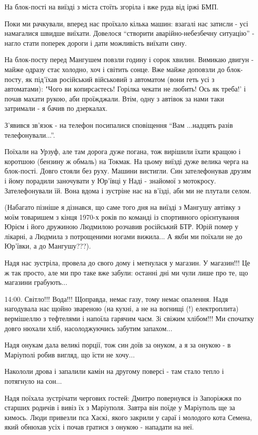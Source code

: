 На блок-пості на виїзді з міста стоїть згоріла і вже руда від іржі БМП. 

Поки ми рачкували, вперед нас проїхало кілька машин: взагалі нас затисли - усі
намагалися швидше виїхати. Довелося \enquote{створити аварійно-небезбечну ситуацію} -
нагло стати поперек дороги і дати можливість виїхати сину.

На блок-посту перед Мангушем повзли годину і сорок хвилин. Вимикаю двигун -
майже одразу стає холодно, хоч і світить сонце. Вже майже доповзли до
блок-посту, як під'їхав російський військовий з автоматом (вони геть усі з
автоматами): "Чого ви копирсаєтесь! Горілка чекати не любить! Ось як треба!' і
почав махати рукою, аби проїжджали. Втім, одну з автівок за нами таки затримали
- я бачив по дзеркалах.

З'явився зв'язок - на телефон посипалися сповіщення \enquote{Вам ...надцять разів
телефонували...}.

Поїхали на Урзуф, але там дорога дуже погана, тож вирішили їхати кращою і
коротшою (бензину ж обмаль) на Токмак. На цьому виїзді дуже велика черга на
блок-пості. Довго стояли  без руху. Машини вистигли. Син зателефонував друзям і
йому порадили заночувати у Юр'ївці у Наді - знайомої з мотокросу.
Зателефонували їй. Вона вдома і зустріне нас на в'їзді, аби ми не плутали
селом.

(Набагато пізніше я дізнався, що саме того дня на виїзді з Мангушу автівку з
моїм товаришем з кінця 1970-х років по команді із спортивного орієнтування
Юрієм і його дружиною Людмилою розчавив російський БТР. Юрій помер у лікарні, а
Людмила з потрощеними ногами вижила... А якби ми поїхали не до Юр'ївки, а до
Мангушу???).

Надя нас зустріла, провела до свого дому і метнулася у магазин. У магазин!!! Це
ж так просто, але ми про таке вже забули: останні дні ми чули лише про те, що
магазини грабують...

14:00. Світло!!! Вода!!! Щоправда, немає газу, тому немає опалення. Надя
нагодувала нас щойно звареною (на кухні, а не на вогнищі (!) електроплита)
вермішеллю з тефтелями і напоїла гарячим чаєм. Зі свіжим хлібом!!! Ми спочатку
довго нюхали хліб, насолоджуючись забутим запахом...

Надя онукам дала великі порції, тож син доїв за онуком, а я за онукою - в
Маріуполі робив вигляд, що їсти не хочу...

Накололи дрова і запалили камін на другому поверсі - там стало тепло і
потягнуло на сон...

Надя поїхала зустрічати чергових гостей: Дмитро повернувся із Запоріжжя по
старших родичів і вивіз їх з Маріуполя. Завтра він поїде у Маріуполь ще за
кимось. Люди привезли пса Хаскі, якого закрили у сараї і молодого кота Семена,
який обнюхав усіх і почав гратися з онукою - нападати на неї.

